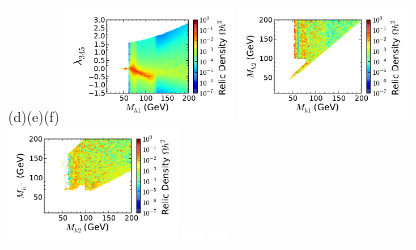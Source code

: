 \documentclass[12pt,a4paper]{article}
\begin{document}
\begin{figure}[htb]
\vskip 0.2cm
\hspace*{1.4cm}(d)\hspace*{0.35\textwidth}\hspace*{-1.4cm}(e)\hspace*{0.35\textwidth}\hspace*{-1.5cm}(f)
\vskip 0.0cm
%
{\hspace*{-0.3cm}\includegraphics[width=0.4\textwidth]{Mh1_ld345_Omega_small-cut1234567_z.pdf}}%
{\hspace*{-1.55cm}\includegraphics[width=0.4\textwidth]{Mh1_Mh2_Omega_small-cut1234567_z.pdf}}%
{\hspace*{-1.55cm}\includegraphics[width=0.4\textwidth]{Mhc_Mh2_Omega_small-cut1234567_z.pdf}}%
\vskip -5.2cm
\hspace*{4.9cm}\includegraphics[width=0.55cm,height=4.cm]{blank.pdf}%
\hspace*{4.9cm}\includegraphics[width=0.55cm,height=4.cm]{blank.pdf}%

\end{figure}
\end{document}
